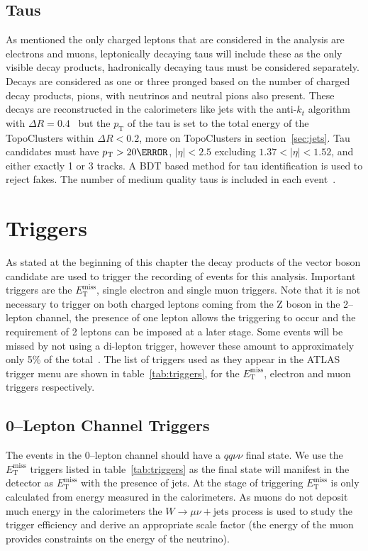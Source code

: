 \subsection{Taus}

As mentioned the only charged leptons that are considered in the analysis are
electrons and muons, leptonically decaying taus will include these as the only
visible decay products, hadronically decaying taus must be considered
separately. Decays are considered as one or three pronged based on the number of
charged decay products, pions, with neutrinos and neutral pions also present.
These decays are reconstructed in the calorimeters like jets with the anti-$k_t$
algorithm with $\Delta R = 0.4$~\cite{ATL-PHYS-PUB-2015-045} but the $p_{\mathrm{T}}$ of
the tau is set to the total energy of the TopoClusters within $\Delta R < 0.2$,
more on TopoClusters in section~\ref{sec:jets}. Tau candidates must have $p_{\mathrm{T}} >
20 \GeV$, $\lvert  \eta \rvert < 2.5$ excluding $1.37 < \lvert \eta \rvert <
1.52$, and either exactly 1 or 3 tracks. A BDT based method for tau
identification is used to reject fakes. The number of medium quality taus is
included in each event~\cite{TauRecommendation2015,TauRecommendation2016}.

\section{Triggers}
\label{sec:triggers}

As stated at the beginning of this chapter the decay products of the vector
boson candidate are used to trigger the recording of events for this analysis.
Important triggers are the $E_{\mathrm{T}}^{\text{miss}}$, single electron and single muon
triggers. Note that it is not necessary to trigger on both charged leptons
coming from the Z boson in the 2--lepton channel, the presence of one lepton
allows the triggering to occur and the requirement of 2 leptons can be imposed
at a later stage. Some events will be missed by not using a di-lepton trigger,
however these amount to approximately only 5\% of the
total~\cite{VHObjectNote2019}. The list of triggers used as they appear in the
ATLAS trigger menu are shown in table~\ref{tab:triggers}, for the
$E_{\mathrm{T}}^{\text{miss}}$, electron and muon triggers respectively.


\subsection{0--Lepton Channel Triggers}
The events in the 0--lepton channel should have a $qq\nu\nu$ final state. We use
the $E_{\mathrm{T}}^{\text{miss}}$ triggers listed in table~\ref{tab:triggers} as the final
state will manifest in the detector as $E_{\mathrm{T}}^{\text{miss}}$ with the presence of
jets. At the stage of triggering $E_{\mathrm{T}}^{\text{miss}}$ is only calculated from
energy measured in the calorimeters. As muons do not deposit much energy in the
calorimeters the $W \to \mu \nu + \text{jets}$ process is used to study the
trigger efficiency and derive an appropriate scale factor (the energy of the
muon provides constraints on the energy of the neutrino).

